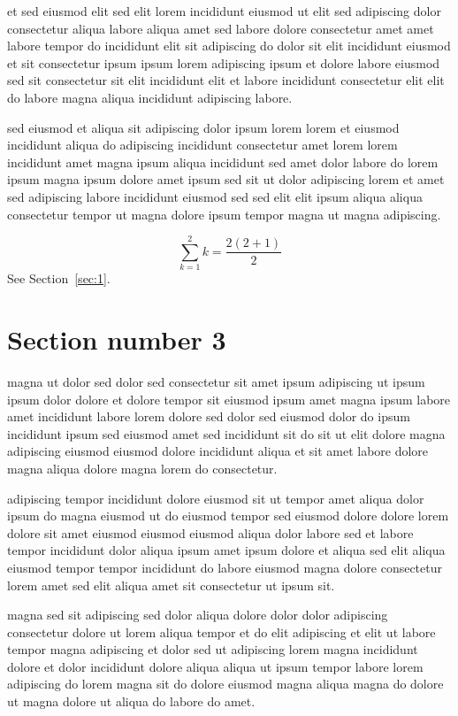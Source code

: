 \documentclass{article}
\begin{document}
et sed eiusmod elit sed elit lorem incididunt eiusmod ut elit sed adipiscing dolor consectetur aliqua labore aliqua amet sed labore dolore consectetur amet amet labore tempor do incididunt elit sit adipiscing do dolor sit elit incididunt eiusmod et sit consectetur ipsum ipsum lorem adipiscing ipsum et dolore labore eiusmod sed sit consectetur sit elit incididunt elit et labore incididunt consectetur elit elit do labore magna aliqua incididunt adipiscing labore.

sed eiusmod et aliqua sit adipiscing dolor ipsum lorem lorem et eiusmod incididunt aliqua do adipiscing incididunt consectetur amet lorem lorem incididunt amet magna ipsum aliqua incididunt sed amet dolor labore do lorem ipsum magna ipsum dolore amet ipsum sed sit ut dolor adipiscing lorem et amet sed adipiscing labore incididunt eiusmod sed sed elit elit ipsum aliqua aliqua consectetur tempor ut magna dolore ipsum tempor magna ut magna adipiscing.

\begin{equation} \sum_{k=1}^{2} k = \frac{2(2+1)}{2} \end{equation}
See Section~\ref{sec:1}.

\section{Section number 3}\label{sec:3}
magna ut dolor sed dolor sed consectetur sit amet ipsum adipiscing ut ipsum ipsum dolor dolore et dolore tempor sit eiusmod ipsum amet magna ipsum labore amet incididunt labore lorem dolore sed dolor sed eiusmod dolor do ipsum incididunt ipsum sed eiusmod amet sed incididunt sit do sit ut elit dolore magna adipiscing eiusmod eiusmod dolore incididunt aliqua et sit amet labore dolore magna aliqua dolore magna lorem do consectetur.

adipiscing tempor incididunt dolore eiusmod sit ut tempor amet aliqua dolor ipsum do magna eiusmod ut do eiusmod tempor sed eiusmod dolore dolore lorem dolore sit amet eiusmod eiusmod eiusmod aliqua dolor labore sed et labore tempor incididunt dolor aliqua ipsum amet ipsum dolore et aliqua sed elit aliqua eiusmod tempor tempor incididunt do labore eiusmod magna dolore consectetur lorem amet sed elit aliqua amet sit consectetur ut ipsum sit.

magna sed sit adipiscing sed dolor aliqua dolore dolor dolor adipiscing consectetur dolore ut lorem aliqua tempor et do elit adipiscing et elit ut labore tempor magna adipiscing et dolor sed ut adipiscing lorem magna incididunt dolore et dolor incididunt dolore aliqua aliqua ut ipsum tempor labore lorem adipiscing do lorem magna sit do dolore eiusmod magna aliqua magna do dolore ut magna dolore ut aliqua do labore do amet.
\end{document}
